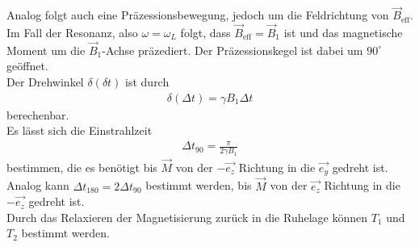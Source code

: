 \documentclass[]{scrartcl}
\begin{document}
Analog folgt auch eine Präzessionsbewegung, jedoch um die Feldrichtung von $\vec{B}_{\text{eff}}$.\\
Im Fall der Resonanz, also $\omega=\omega_L$ folgt, dass $\vec{B}_{\text{eff}}=\vec{B}_1$ ist und das magnetische Moment um die $\vec{B}_1$-Achse präzediert. Der Präzessionskegel ist dabei um $90^\circ$ geöffnet.\\
Der Drehwinkel $\delta\left(\delta t\right)$ ist durch
\begin{align}
\delta\left(\Delta t\right)=\gamma B_1 \Delta t
\end{align}
berechenbar.\\
Es lässt sich die Einstrahlzeit 
\begin{align}
\Delta t_{90}=\frac{\pi}{2\gamma B_1} 
\end{align}
bestimmen, die es benötigt bis $\vec{M}$ von der $-\vec{e_z}$ Richtung in die  $\vec{e_y}$ gedreht ist.\\
Analog kann $\Delta t_{180}=2 \Delta t_{90}$ bestimmt werden, bis $\vec{M}$ von der $\vec{e_z}$ Richtung in die  $-\vec{e_z}$ gedreht ist.\\ 
Durch das Relaxieren der Magnetisierung zurück in die Ruhelage können $T_1$ und $T_2$ bestimmt werden.
\end{document}
